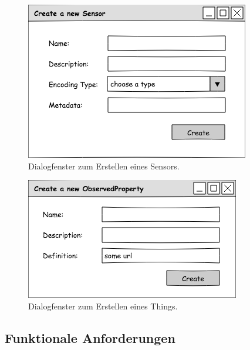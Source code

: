 \documentclass[12 pt]{article}
\begin{document}
\begin{figure}[ht]
\centering
\includegraphics[scale=1]{images/create_sensor}
\caption{\label{fig:sensor}Dialogfenster zum Erstellen eines Sensors.}
\end{figure}

\begin{figure}[ht]
\centering
\includegraphics[scale=1]{images/create_observedproperty}
\caption{\label{fig:obsProp}Dialogfenster zum Erstellen eines Things.}
\end{figure}

\subsection{Funktionale Anforderungen}
\end{document}
